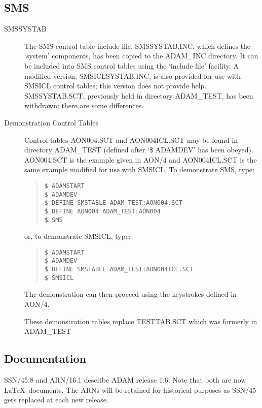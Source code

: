 \subsection{SMS}
\label{smssystab}
\begin{description}
\item[SMSSYSTAB]
The SMS control table include file, SMSSYSTAB.INC, which defines the `system'
components, has been copied to the ADAM\_INC directory.
It can be included into SMS control tables using the `include file' facility.
A modified version, SMSICL\-SYSTAB\-.INC, is also provided for use with SMSICL
control tables; this version does not provide help.
SMSSYSTAB.SCT, previously held in directory ADAM\_TEST, has been withdrawn;
there are some differences.

\item[Demonstration Control Tables]
Control tables AON004\-.SCT and AON004ICL\-.SCT may be found in directory
ADAM\_TEST (defined after `\$ ADAMDEV' has been obeyed).
AON004\-.SCT is the example given in AON/4 and AON004ICL\-.SCT is the same 
example modified for use with SMSICL.
To demonstrate SMS, type:
\begin{quote}
\begin{verbatim}
$ ADAMSTART
$ ADAMDEV
$ DEFINE SMSTABLE ADAM_TEST:AON004.SCT
$ DEFINE AON004 ADAM_TEST:AON004
$ SMS
\end{verbatim}
\end{quote}
or, to demonstrate SMSICL, type:
\begin{quote}
\begin{verbatim}
$ ADAMSTART
$ ADAMDEV
$ DEFINE SMSTABLE ADAM_TEST:AON004ICL.SCT
$ SMSICL
\end{verbatim}
\end{quote}
The demonstration can then proceed using the keystrokes defined in AON/4.

These demonstration tables replace TESTTAB.SCT which was formerly in
ADAM\-\_TEST
\end{description}

\subsection{Documentation}
\label{docs}
SSN/45.8 and ARN/16.1 describe ADAM release 1.6.
Note that both are now \LaTeX\ documents. 
The ARNs will be retained for historical purposes as SSN/45 gets replaced at
each new release.

